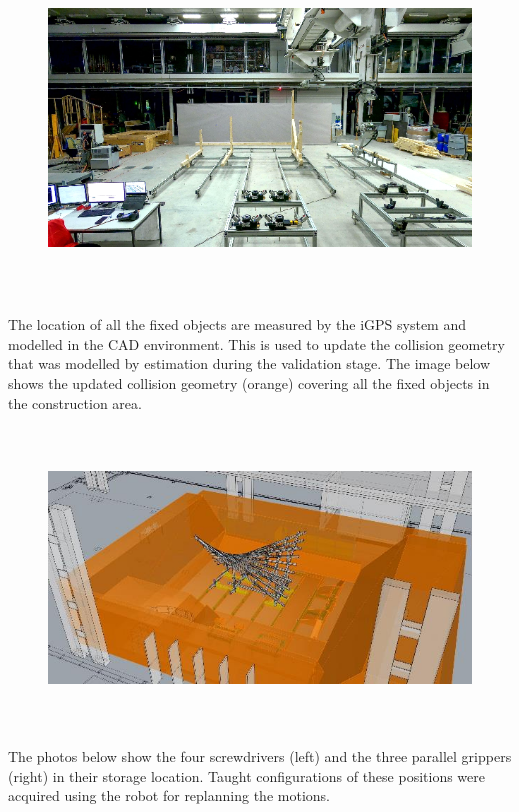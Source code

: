 \documentclass[11pt]{book}
\begin{document}
\begin{figure}[H]
\includegraphics[width=15.92cm,height=8.96cm]{./images/image31.png}
\end{figure}


The location of all the fixed objects are measured by the iGPS system and modelled in the CAD environment. This is used to update the collision geometry that was modelled by estimation during the validation stage. The image below shows the updated collision geometry (orange) covering all the fixed objects in the construction area. 

\begin{figure}[H]
\includegraphics[width=15.92cm,height=7.97cm]{./images/image32.jpeg}
\end{figure}


The photos below show the four screwdrivers (left) and the three parallel grippers (right) in their storage location. Taught configurations of these positions were acquired using the robot for replanning the motions. 
\end{document}
